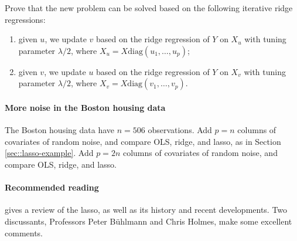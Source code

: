 Prove that the new problem can be solved based on the following iterative ridge regressions:
\begin{enumerate}
\item
given $u$, we update $v$ based on the ridge regression of $Y$ on $X_u$ with tuning parameter $\lambda /2$, where $X_u = X \text{diag}(u_1,\ldots, u_p)$;
\item
given $v$, we update $u$ based on the ridge regression of $Y$ on $X_v$ with tuning parameter $\lambda/2$, where $X_v = X \text{diag}(v_1,\ldots, v_p)$.

\end{enumerate}


 

\paragraph{More noise in the Boston housing data}

The Boston housing data have $n=506$ observations. Add $p=n$ columns of covariates of random noise, and compare OLS, ridge, and lasso, as in Section \ref{sec::lasso-example}. Add $p=2n$ columns of covariates of random noise, and compare OLS, ridge, and lasso. 

 
\paragraph{Recommended reading}


\citet{tibshirani2011regression}  gives a review of the lasso, as well as its history and recent developments. Two discussants, Professors Peter B\"uhlmann and Chris Holmes, make some excellent comments. 

 
 
